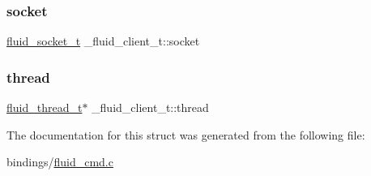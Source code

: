 \subsubsection{\texorpdfstring{socket}{socket}}
{\footnotesize\ttfamily \hyperlink{fluidsynth__priv_8h_ad024f40f94120b0766cda0ad9f47be82}{fluid\+\_\+socket\+\_\+t} \+\_\+fluid\+\_\+client\+\_\+t\+::socket}

\mbox{\label{struct__fluid__client__t_af50bd49f0c5399b2d5de33b282ce4379}} 
\subsubsection{\texorpdfstring{thread}{thread}}
{\footnotesize\ttfamily \hyperlink{fluid__sys_8h_a60a6466e68a45b0f0709f1ebaa7e6f85}{fluid\+\_\+thread\+\_\+t}$\ast$ \+\_\+fluid\+\_\+client\+\_\+t\+::thread}



The documentation for this struct was generated from the following file\+:\begin{DoxyCompactItemize}
\item 
bindings/\hyperlink{fluid__cmd_8c}{fluid\+\_\+cmd.\+c}\end{DoxyCompactItemize}
